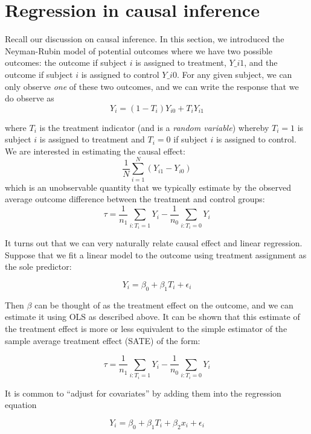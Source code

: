 

\chapter{Regression in causal inference}
\label{ch:causalreg}


Recall our discussion on causal inference. In this section, we introduced the Neyman-Rubin model of potential outcomes where we have two possible outcomes: the outcome if subject $i$ is assigned to treatment, $Y\_{i1}$, and the outcome if subject $i$ is assigned to control $Y\_{i0}$. For any given subject, we can only observe \textit{one} of these two outcomes, and we can write the response that we do observe as
$$Y_i = ( 1- T_i) Y_{i0} + T_i Y_{i1}$$

where $T_i$ is the treatment indicator (and is a \textit{random variable}) whereby $T_i = 1$ is subject $i$ is assigned to treatment and $T_i = 0$ if subject $i$ is assigned to control. We are interested in estimating the causal effect:
$$\frac{1}{N}\sum_{i=1}^N (Y_{i1} - Y_{i0})$$
which is an unobservable quantity that we typically estimate by the observed average outcome difference between the treatment and control groups:
$$\tau = \frac{1}{n_1} \sum_{i : T_i = 1} Y_i - \frac{1}{n_0} \sum_{i : T_i = 0} Y_i$$

It turns out that we can very naturally relate causal effect and linear regression. Suppose that we fit a linear model to the outcome using treatment assignment as the sole predictor:

$$Y_i = \beta_0 + \beta_1 T_i + \epsilon_i$$

Then $\beta$ can be thought of as the treatment effect on the outcome, and we can estimate it using OLS as described above. It can be shown that this estimate of the treatment effect is more or less equivalent to the simple estimator of the sample average treatment effect (SATE) of the form:

$$\tau = \frac{1}{n_1} \sum_{i : T_i = 1} Y_i - \frac{1}{n_0} \sum_{i : T_i = 0} Y_i$$

It is common to ``adjust for covariates'' by adding them into the regression equation

$$Y_i = \beta_0 + \beta_1 T_i + \beta_2 x_i +  \epsilon_i$$

